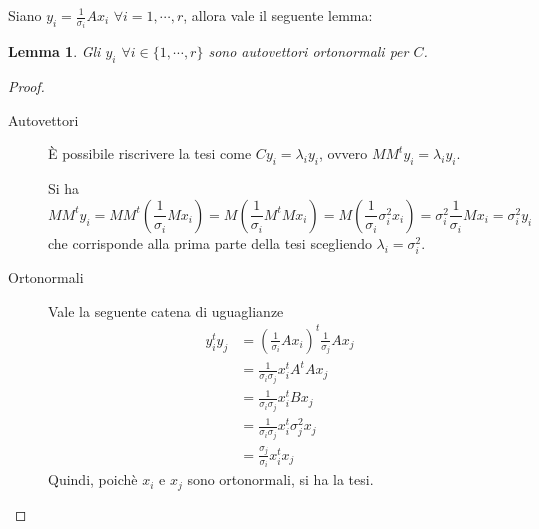 \documentclass[12pt,a4paper]{article}
\theoremstyle{thm}
\newtheorem{lemma}[theorem]{Lemma}
\theoremstyle{def}
\begin{document}
\vspace{0.5cm}
Siano $y_i = \frac{1}{\sigma_i} Ax_i$ $\forall i=1, \cdots, r$, allora vale il seguente lemma:

\begin{lemma}
Gli $y_i$ $\forall i \in \{1, \cdots, r\}$ sono autovettori ortonormali per $C$.
\end{lemma}

\newpage

\begin{proof}~

\begin{description}
\item[{\sc Autovettori}] È possibile riscrivere la tesi come $Cy_i = \lambda_i y_i$, ovvero $MM^ty_i = \lambda_i y_i$.

Si ha \[
	MM^ty_i = MM^t\left(\frac{1}{\sigma_i}Mx_i\right) =
	M\left(\frac{1}{\sigma_i}M^tMx_i\right) =
	M \left(\frac{1}{\sigma_i}\sigma_i^2x_i\right) =
	\sigma_i^2 \frac{1}{\sigma_i} Mx_i =
	\sigma_i^2 y_i
\] che corrisponde alla prima parte della tesi scegliendo $\lambda_i = \sigma_i^2$.
\item[{\sc Ortonormali}] Vale la seguente catena di uguaglianze
\begin{align*}
y_i^t y_j & = \left( \frac{1}{\sigma_i} A x_i \right) ^t \frac{1}{\sigma_j}A x_j\\
& = \frac{1}{\sigma_i \sigma_j} x_i^t A^t A x_j\\
& = \frac{1}{\sigma_i \sigma_j} x_i^t B x_j\\
& = \frac{1}{\sigma_i \sigma_j} x_i^t \sigma_j^2 x_j\\
& = \frac{\sigma_j}{\sigma_i} x_i^t x_j
\end{align*}
Quindi, poichè $x_i$ e $x_j$ sono ortonormali, si ha la tesi.
\end{description}
\end{proof}
\end{document}
